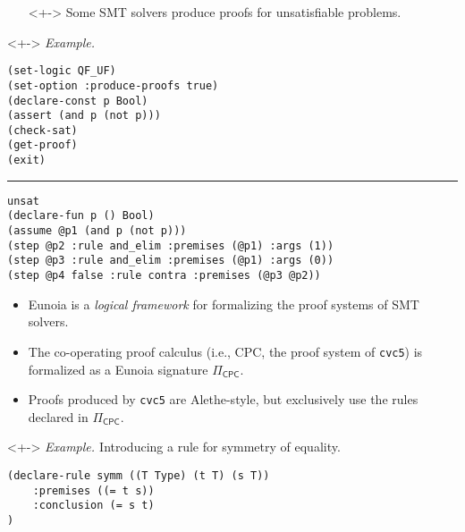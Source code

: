 \documentclass[lualatex, compress, 12pt]{beamer}
\newcommand{\exxample}{{\mediumfont\itshape{\textcolor{oc-green-9}{Example.} }}}
\begin{document}
\begin{frame}[fragile]
	\begin{itemize}
		\item[]<+-> \hspace{-5mm}Some SMT solvers produce \alert{proofs}
		      for unsatisfiable problems.
	\end{itemize}
	\begin{uncoverenv}<+->
		\exxample
		\begin{lstlisting}[basicstyle=\ttfamily\footnotesize]
(set-logic QF_UF)
(set-option :produce-proofs true)
(declare-const p Bool)
(assert (and p (not p)))
(check-sat)
(get-proof)
(exit)\end{lstlisting}
		\hrule
		\begin{lstlisting}[basicstyle=\ttfamily\footnotesize]
unsat
(declare-fun p () Bool)
(assume @p1 (and p (not p)))
(step @p2 :rule and_elim :premises (@p1) :args (1))
(step @p3 :rule and_elim :premises (@p1) :args (0))
(step @p4 false :rule contra :premises (@p3 @p2))\end{lstlisting}
	\end{uncoverenv}
\end{frame}

\newcommand{\cpc}{\mathsf{CPC}}

\begin{frame}[fragile]
	\begin{itemize}
		\item<+->
		      \alert{Eunoia} is a \emph{logical framework} for
		      formalizing the proof systems of SMT solvers.

		\item<+-> The \alert{co-operating proof calculus}
		      (i.e., CPC, the proof system of \texttt{cvc5})
		      is formalized as a Eunoia signature $\Pi_{\cpc}$.

		\item<+-> Proofs produced by \texttt{cvc5} are
		      Alethe-style, but exclusively use the rules
		      declared in $\Pi_{\cpc}$.
	\end{itemize}

	\begin{uncoverenv}<+->
		\exxample Introducing a rule for symmetry of equality.
		\begin{lstlisting}
(declare-rule symm ((T Type) (t T) (s T))
    :premises ((= t s))
    :conclusion (= s t)
)\end{lstlisting}

	\end{uncoverenv}
\end{frame}
\end{document}
